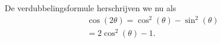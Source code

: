 \documentclass{article}
\begin{document}


    De verdubbelingsformule herschrijven we nu als
    \begin{align}
        \cos(2\theta) = \cos^2(\theta)-\sin^2(\theta)\\
        = 2\cos^2(\theta)-1.
    \end{align}




\end{document}
